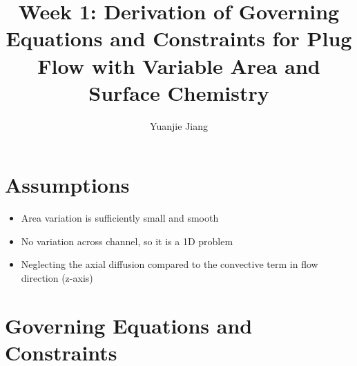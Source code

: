 \documentclass[11pt]{article}
\begin{document}
%
\author{Yuanjie Jiang}
\title{Week 1: Derivation of Governing Equations and Constraints for Plug Flow with Variable Area and Surface Chemistry}
\maketitle
\section{Assumptions}
\begin{itemize}
    \item Area variation is sufficiently small and smooth
    \item No variation across channel, so it is a 1D problem
    \item Neglecting the axial diffusion compared to the convective term in flow direction (z-axis)
\end{itemize}


\section{Governing Equations and Constraints}
\end{document}
